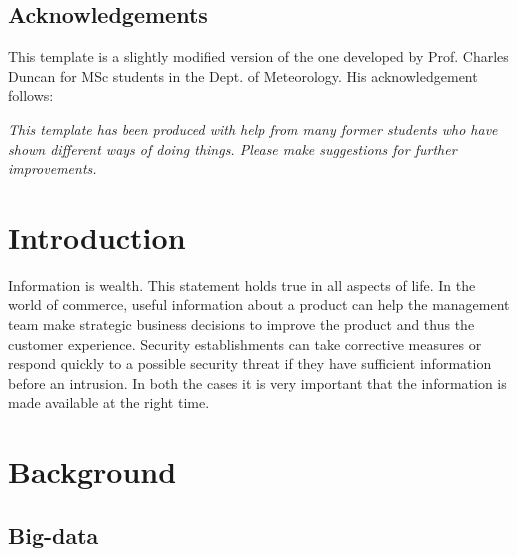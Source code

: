 \documentclass[12pt,a4paper]{report}
\begin{document}

\tableofcontents
\listoftables
\listoffigures

\begin{titlepage}
\vspace*{2in}
\section*{Acknowledgements}

This template is a slightly modified version of the one developed by
Prof. Charles Duncan for MSc students in the Dept. of Meteorology. His
acknowledgement follows:

{\em This template has been produced with help from many former students who
have shown different ways of doing things. Please make suggestions for
further improvements.}

\end{titlepage}


\chapter{Introduction}

Information is wealth. This statement holds true in all aspects of
life. In the world of commerce, useful information about a product 
can help the management team make strategic business decisions
to improve the product and thus the customer experience. Security establishments
can take corrective measures or respond quickly to a possible security threat
if they have sufficient information before an intrusion. In both the cases
it is very important that the information is made available at the right time. 

\chapter{Background}

\section{Big-data}

\end{document}
